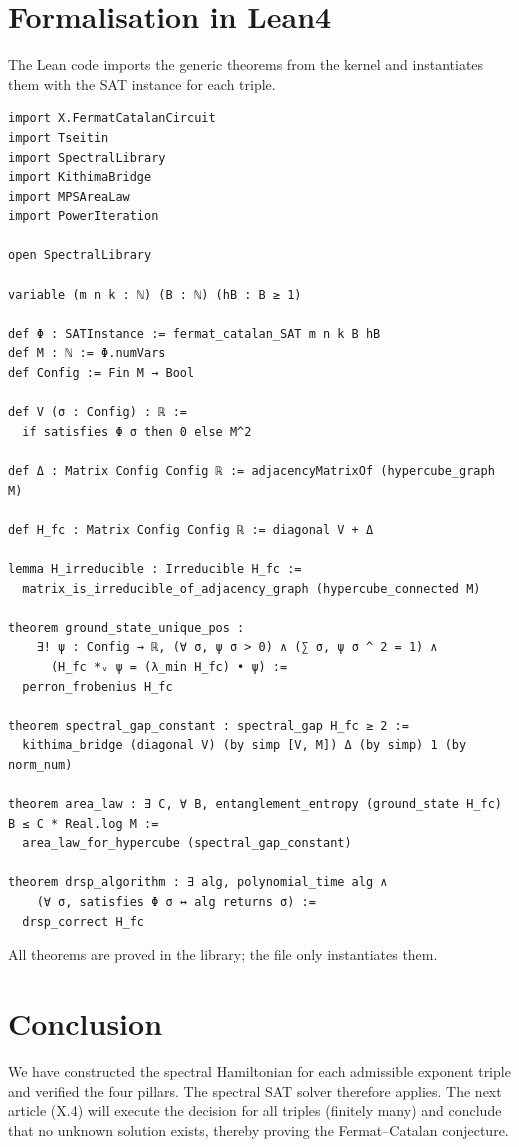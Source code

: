 \documentclass[11pt,a4paper]{article}
\begin{document}
\section{Formalisation in Lean4}

The Lean code imports the generic theorems from the kernel and instantiates them with the SAT instance for each triple.

\begin{lstlisting}[style=lean, caption={SeriesX/FermatCatalanHamiltonian.lean (excerpt)}]
import X.FermatCatalanCircuit
import Tseitin
import SpectralLibrary
import KithimaBridge
import MPSAreaLaw
import PowerIteration

open SpectralLibrary

variable (m n k : ℕ) (B : ℕ) (hB : B ≥ 1)

def Φ : SATInstance := fermat_catalan_SAT m n k B hB
def M : ℕ := Φ.numVars
def Config := Fin M → Bool

def V (σ : Config) : ℝ :=
  if satisfies Φ σ then 0 else M^2

def Δ : Matrix Config Config ℝ := adjacencyMatrixOf (hypercube_graph M)

def H_fc : Matrix Config Config ℝ := diagonal V + Δ

lemma H_irreducible : Irreducible H_fc :=
  matrix_is_irreducible_of_adjacency_graph (hypercube_connected M)

theorem ground_state_unique_pos :
    ∃! ψ : Config → ℝ, (∀ σ, ψ σ > 0) ∧ (∑ σ, ψ σ ^ 2 = 1) ∧
      (H_fc *ᵥ ψ = (λ_min H_fc) • ψ) :=
  perron_frobenius H_fc

theorem spectral_gap_constant : spectral_gap H_fc ≥ 2 :=
  kithima_bridge (diagonal V) (by simp [V, M]) Δ (by simp) 1 (by norm_num)

theorem area_law : ∃ C, ∀ B, entanglement_entropy (ground_state H_fc) B ≤ C * Real.log M :=
  area_law_for_hypercube (spectral_gap_constant)

theorem drsp_algorithm : ∃ alg, polynomial_time alg ∧
    (∀ σ, satisfies Φ σ ↔ alg returns σ) :=
  drsp_correct H_fc
\end{lstlisting}

All theorems are proved in the library; the file only instantiates them.

\section{Conclusion}

We have constructed the spectral Hamiltonian for each admissible exponent triple and verified the four pillars. The spectral SAT solver therefore applies. The next article (X.4) will execute the decision for all triples (finitely many) and conclude that no unknown solution exists, thereby proving the Fermat–Catalan conjecture.
\end{document}
